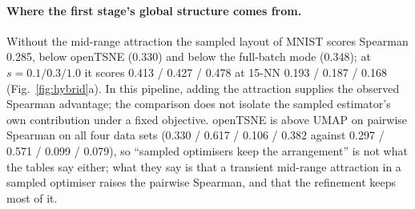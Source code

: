 \documentclass[11pt]{article}
\begin{document}
\paragraph{Where the first stage's global structure comes from.} Without the mid-range attraction the
sampled layout of MNIST scores Spearman 0.285, below openTSNE (0.330) and below the full-batch mode
(0.348); at $s = 0.1 / 0.3 / 1.0$ it scores 0.413 / 0.427 / 0.478 at 15-NN 0.193 / 0.187 / 0.168
(Fig.~\ref{fig:hybrid}a). In this pipeline, adding the attraction supplies the observed Spearman
advantage; the comparison does not isolate the sampled estimator's own contribution under a fixed
objective. openTSNE is above UMAP on pairwise Spearman on all four data sets (0.330 / 0.617 / 0.106 /
0.382 against 0.297 / 0.571 / 0.099 / 0.079), so ``sampled optimisers keep the arrangement'' is not what
the tables say either; what they say is that a transient mid-range attraction in a sampled optimiser
raises the pairwise Spearman, and that the refinement keeps most of it.
\end{document}
